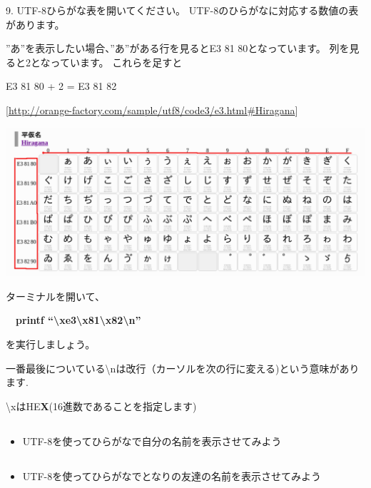 \bigskip

9.
UTF-8ひらがな表を開いてください。
UTF-8のひらがなに対応する数値の表があります。

”あ”を表示したい場合、”あ”がある行を見るとE3
81
80となっています。
列を見ると2となっています。
これらを足すと

E3 81 80 + 2 = E3 81 82

[\url{http://orange-factory.com/sample/utf8/code3/e3.html#Hiragana}]

\begin{center}
\includegraphics[width=\textwidth]{./text08-img/textbook-img018.png}

\end{center}
ターミナルを開いて、

\ \ \textbf{printf “{\textbackslash}xe3{\textbackslash}x81{\textbackslash}x82{\textbackslash}n”}

を実行しましょう。

一番最後についている{\textbackslash}nは改行（カーソルを次の行に変える)という意味があります.

{\textbackslash}xはHE\textbf{X}(16進数であることを指定します)

\subsection*{\theQuestion\label{Q:myNameUTF8}}
\begin{itemize}
\item
UTF-8を使ってひらがなで自分の名前を表示させてみよう
\end{itemize}
\subsection*{\theQuestion\label{Q:friendNameUTF8}}
\begin{itemize}
\item
UTF-8を使ってひらがなでとなりの友達の名前を表示させてみよう
\end{itemize}

